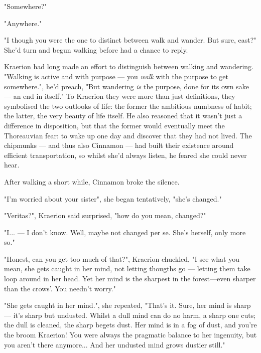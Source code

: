 "Somewhere?"

"Anywhere."

"I though you were the one to distinct between walk and wander. But sure, east?"
She'd turn and begun walking before had a chance to reply. 


Kraerion had long made an effort to distinguish between walking and wandering. "Walking is active and with purpose — you \textit{walk} with the purpose to get somewhere.", he'd preach, "But wandering \textit{is} the purpose, done for its own sake — an end in itself." To Kraerion they were more than just definitions, they symbolised the two outlooks of life: the former the ambitious numbness of habit; the latter, the very beauty of life itself. He also reasoned that it wasn't just a difference in disposition, but that the former would eventually meet the Thoreauvian fear: to wake up one day and discover that they had not lived. The chipmunks — and thus also Cinnamon — had built their existence around efficient transportation, so whilst she'd always listen, he feared she could never hear.

After walking a short while, Cinnamon broke the silence.

"I'm worried about your sister", she began tentatively, "she's changed." 

"Veritas?", Kraerion said surprised, "how do you mean, changed?"

"I... — I don't know. Well, maybe not changed per se. She's herself, only more so."



"Honest, can you get too much of that?", Kraerion chuckled, "I see what you mean, she gets caught in her mind, not letting thougths go — letting them take loop around in her head. Yet her mind is the sharpest in the forest—even sharper than the crows'. You needn't worry."

"She gets caught in her mind.", she repeated, "That's it. Sure, her mind is sharp — it's sharp but undusted. Whilst a dull mind can do no harm, a sharp one cuts; the dull is cleaned, the sharp begets dust. Her mind is in a fog of dust, and you're the broom Kraerion! You were always the pragmatic balance to her ingenuity, but you aren't there anymore... And her undusted mind grows dustier still."

